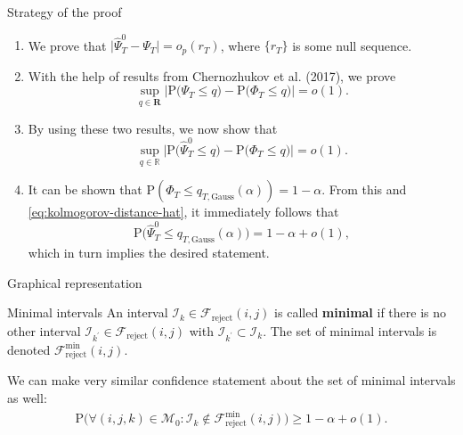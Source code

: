 \documentclass[10pt, handout]{beamer}
\newcommand{\Prob}{\mathrm{P}}
\begin{document}
\begin{frame}{Strategy of the proof}
\begin{enumerate}
\item We prove that  $\big| \hat{\Psi}_T^0 - \Psi_T \big| = o_p(r_T)$, where $\{r_T\}$ is some null sequence.\pause
\item With the help of results from Chernozhukov et al. (2017), we prove
\begin{equation*}\label{eq:kolmogorov-distance}
\sup_{q \in \mathbf{R}} \Big| \Prob\big( \Psi_T \le q \big) - \Prob\big( \Phi_T \le q \big) \Big| = o(1).
\end{equation*}\pause
\item By using these two results, we now show that 
\begin{equation}\label{eq:kolmogorov-distance-hat}
\sup_{q \in \mathbb{R}} \Big| \Prob\big( \hat{\Psi}_T^0 \le q \big) - \Prob\big( \Phi_T \le q \big) \Big| = o(1).
\end{equation}\pause
\item It can be shown that $\Prob (\Phi_T \le q_{T,\text{Gauss}}(\alpha)) = 1-\alpha$. From this and \eqref{eq:kolmogorov-distance-hat}, it immediately follows that  
\begin{equation*}
\Prob\big( \hat{\Psi}_T^0 \le q_{T,\text{Gauss}}(\alpha) \big) = 1 - \alpha + o(1), 
\end{equation*}
which in turn implies the desired statement.
\end{enumerate}
\end{frame}

\begin{frame}{Graphical representation}
\begin{block}{Minimal intervals}
An interval $\mathcal{I}_k \in \mathcal{F}_{\text{reject}}(i, j)$ is called \textbf{minimal} if there is no other interval $\mathcal{I}_{k^\prime} \in \mathcal{F}_{\text{reject}}(i, j)$ with $\mathcal{I}_{k^\prime} \subset \mathcal{I}_k$. The set of minimal intervals is denoted $\mathcal{F}_{\text{reject}}^{\min} (i, j)$.
\end{block}\pause
We can make very similar confidence statement about the set of minimal intervals as well:
\begin{align*}
 \Prob\Big( \forall (i,j,k) \in \mathcal{M}_0: \mathcal{I}_k \notin \mathcal{F}_{\text{reject}}^{\min} (i, j) \Big) \ge 1 - \alpha + o(1).
\end{align*}
\end{frame}
\end{document}
